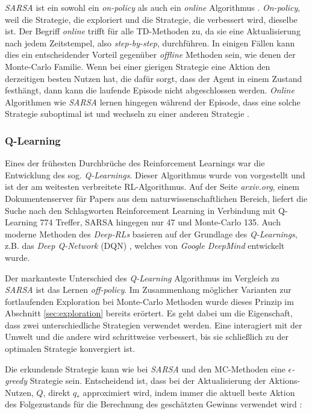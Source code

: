 \par 
\textit{SARSA} ist ein sowohl ein \textit{on-policy} als auch ein \textit{online} Algorithmus \cite[S.~129f]{Sutton1998}. \textit{On-policy}, weil die Strategie, die exploriert und die Strategie, die verbessert wird, dieselbe ist. Der Begriff \textit{online} trifft für alle TD-Methoden zu, da sie eine Aktualisierung nach jedem Zeitstempel, also \textit{step-by-step}, durchführen. In einigen Fällen kann dies ein entscheidender Vorteil gegenüber \textit{offline} Methoden sein, wie denen der Monte-Carlo Familie. Wenn bei einer gierigen Strategie eine Aktion den derzeitigen besten Nutzen hat, die dafür sorgt, dass der Agent in einem Zustand festhängt, dann kann die laufende Episode nicht abgeschlossen werden. \textit{Online} Algorithmen wie \textit{SARSA} lernen hingegen während der Episode, dass eine solche Strategie suboptimal ist und wechseln zu einer anderen Strategie \cite[S.~130]{Sutton1998}.

\subsubsection{Q-Learning}
Eines der frühesten Durchbrüche des Reinforcement Learnings war die Entwicklung des sog. \textit{Q-Learnings}. Dieser Algorithmus wurde von \cite{watkins1989learning} vorgestellt und ist der am weitesten verbreitete RL-Algorithmus. Auf der Seite \textit{arxiv.org}, einem Dokumentenserver für Papers aus dem naturwissenschaftlichen Bereich, liefert die Suche nach den Schlagworten \glqq Reinforcement Learning\grqq{} in Verbindung mit \glqq Q-Learning\grqq{} 774 Treffer, \glqq SARSA\grqq{} hingegen nur 47 und \glqq Monte-Carlo\grqq{} 135. Auch moderne Methoden des \textit{Deep-RLs} basieren auf der Grundlage des \textit{Q-Learnings}, z.B. das \textit{Deep Q-Network} (DQN) \cite{dqn}, welches von \textit{Google DeepMind} entwickelt wurde.
\par 
Der markanteste Unterschied des \textit{Q-Learning} Algorithmus im Vergleich zu \textit{SARSA} ist das Lernen \textit{off-policy}. Im Zusammenhang möglicher Varianten zur fortlaufenden Exploration bei Monte-Carlo Methoden wurde dieses Prinzip im Abschnitt \ref{sec:exploration} bereits erörtert. Es geht dabei um die Eigenschaft, dass zwei unterschiedliche Strategien verwendet werden. Eine interagiert mit der Umwelt und die andere wird schrittweise verbessert, bis sie schließlich zu der optimalen Strategie konvergiert ist. 
\par 
Die erkundende Strategie kann wie bei \textit{SARSA} und den MC-Methoden eine $\epsilon$\textit{-greedy} Strategie sein. 
 Entscheidend ist, dass bei der Aktualisierung der Aktions-Nutzen, $Q$, direkt $q_*$ approximiert wird, indem immer die aktuell beste Aktion des Folgezustands für die Berechnung des geschätzten Gewinns verwendet wird \cite[S.131]{Sutton1998}: 

